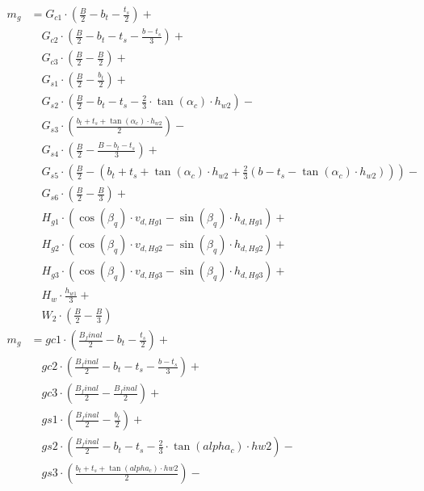 \documentclass[a4paper, 11pt]{article}
\begin{document}
\begin{align*}
m_{g} &= G_{c1} \cdot \left( \frac{B}{2} - b_{t} - \frac{t_{s}}{2} \right) +  \\
   &\quad G_{c2} \cdot \left( \frac{B}{2} - b_{t} - t_{s} - \frac{b - t_{s}}{3} \right) + \\
   &\quad G_{c3} \cdot \left( \frac{B}{2} - \frac{B}{2} \right) + \\
   &\quad G_{s1} \cdot \left( \frac{B}{2} - \frac{b_{t}}{2} \right) + \\
   &\quad G_{s2} \cdot \left( \frac{B}{2} - b_{t} - t_{s} - \frac{2}{3} \cdot \tan (\alpha_{c}) \cdot h_{w2} \right) - \\
   &\quad G_{s3} \cdot \left( \frac{b_{t} + t_{s} + \tan (\alpha_{c}) \cdot h_{w2}}{2}  \right) - \\
   &\quad G_{s4} \cdot \left( \frac{B}{2} - \frac{B - b_{t} - t_{s}}{3} \right) + \\
   &\quad G_{s5} \cdot \left( \frac{B}{2} - \left(b_{t} + t_{s} + \tan(\alpha_{c}) \cdot h_{w2} + \frac{2}{3} \left(b - t_{s} - \tan(\alpha_{c}) \cdot h_{w2} \right)\right) \right) - \\
   &\quad G_{s6} \cdot \left( \frac{B}{2} - \frac{B}{3} \right) + \\
   &\quad H_{g1} \cdot  \left( \cos (\beta_{q}) \cdot v_{d,Hg1} -  \sin (\beta_{q}) \cdot h_{d,Hg1} \right) + \\
   &\quad H_{g2} \cdot \left( \cos (\beta_{q}) \cdot v_{d,Hg2} -  \sin (\beta_{q}) \cdot h_{d,Hg2} \right) +  \\
   &\quad H_{g3} \cdot \left( \cos (\beta_{q}) \cdot v_{d,Hg3} -  \sin (\beta_{q}) \cdot h_{d,Hg3} \right) +  \\
   &\quad H_{w} \cdot \frac{h_{w1}}{3} + \\
   &\quad W_2 \cdot \left( \frac{B}{2} - \frac{B}{3} \right) \\
m_{g} &= gc1 \cdot \left( \frac{B_final}{2} - b_t - \frac{t_s}{2} \right) +  \\
   &\quad gc2 \cdot \left( \frac{B_final}{2} - b_t - t_s - \frac{b - t_s}{3} \right) + \\
   &\quad gc3 \cdot \left( \frac{B_final}{2} - \frac{B_final}{2} \right) + \\
   &\quad gs1 \cdot \left( \frac{B_final}{2} - \frac{b_t}{2} \right) + \\
   &\quad gs2 \cdot \left( \frac{B_final}{2} - b_t - t_s - \frac{2}{3} \cdot \tan (alpha_c) \cdot hw2 \right) - \\
   &\quad gs3 \cdot \left( \frac{b_t + t_s + \tan (alpha_c) \cdot hw2}{2}  \right) - \\

\end{align*}
\end{document}
